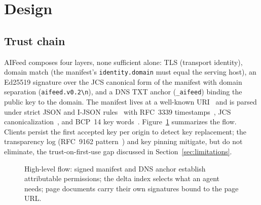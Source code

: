 \documentclass[11pt]{article}
\newcommand{\aifeed}{AIFeed}
\newcommand{\aimd}{AIFeed Markdown}
\newcommand{\mako}{MAKO}
\newcommand{\code}[1]{\texttt{#1}}
\begin{document}
\section{Design}

\subsection{Trust chain}

\aifeed{} composes four layers, none sufficient alone: TLS (transport identity), domain
match (the manifest's \code{identity.domain} must equal the serving host), an Ed25519
signature over the JCS canonical form of the manifest with domain separation
(\code{aifeed.v0.2\textbackslash n}), and a DNS TXT anchor (\code{\_aifeed}) binding the
public key to the domain. The manifest lives at a well-known URI~\citep{rfc8615} and is
parsed under strict JSON and I-JSON rules~\citep{rfc8259,rfc7493} with RFC~3339
timestamps~\citep{rfc3339}, JCS canonicalization~\citep{rfc8785}, and BCP~14 key
words~\citep{rfc2119,rfc8174}. Figure~\ref{fig:flow} summarizes the flow. Clients persist
the first accepted key per origin to detect key replacement; the transparency log
(RFC~9162 pattern~\citep{rfc9162}) and key pinning mitigate, but do not eliminate, the
trust-on-first-use gap discussed in Section~\ref{sec:limitations}.

\begin{figure}[t]
\centering
{}
\caption{High-level flow: signed manifest and DNS anchor establish attributable
permissions; the delta index selects what an agent needs; page documents carry their own
signatures bound to the page URL.}
\label{fig:flow}
\end{figure}
\end{document}
